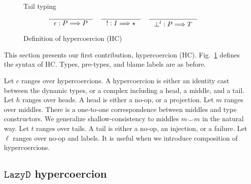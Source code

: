 \documentclass[acmsmall,review,anonymous]{acmart}\settopmatter{printfolios=true,printccs=false,printacmref=false}
\newcommand{\figref}[1]{Fig.~\ref{#1}}
\newcommand{\lazyD}{$\mathtt{Lazy D}$}
\newcommand{\TOOdyn}[0]{\star}
\newcommand{\typingHC}[3]{#1 : #2 \Longrightarrow #3}
\begin{document}
\begin{figure}
		Tail typing \fbox{$ \typingHC{t}{P}{T} $}
		\begin{gather*}
		\inference{}{\typingHC{\epsilon}{P}{P}} \quad
		\inference{}{\typingHC{!}{I}{\TOOdyn}} \quad
		\inference{}{\typingHC{\bot^l}{P}{T}} \quad
		\end{gather*}
	
	\caption{Definition of hypercoercion (HC)}
	\label{fig:hypercoercion}
\end{figure}

This section presents our first contribution, hypercoercion (HC). 
\figref{fig:hypercoercion} defines the syntax of HC.
Types, pre-types, and blame labels are as before.

Let $ c $ ranges over hypercoercions. A hypercoercion is either 
an identity cast between the dynamic types, or a complex including a head, a 
middle, and a tail. 
Let $ h $ ranges over heads. A head is either a no-op, or a projection.
Let $ m $ ranges over middles. There is a one-to-one 
correspondence between middles and type constructors. 
We generalize shallow-consistency to middles $ m \smile m $ in the natural way.
Let $ t $ ranges over tails. A tail is either a no-op, an injection, or a 
failure. 
Let $ \ell $ ranges over no-op and labels. It is useful when we introduce 
composition of hypercoercions.

\subsection{\lazyD{} hypercoercion}
\end{document}
